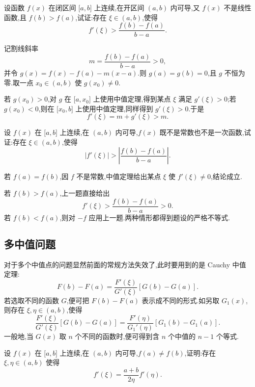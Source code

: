 \begin{example}
    设函数 $f(x)$ 在闭区间 $\lbrack a,b\rbrack$ 上连续,在开区间 $(a,b)$ 内可导,又 $f(x)$ 不是线性函数,且 $f(b)>f(a)$,试证:存在 $\xi\in(a,b)$,使得
    \[
        f'(\xi)>\dfrac{f(b)-f(a)}{b-a}.
    \]
\end{example}
\exampleblank

\begin{solution}
    记割线斜率
    \[
        m=\dfrac{f(b)-f(a)}{b-a}>0,
    \]
    并令 $g(x)=f(x)-f(a)-m(x-a)$.则 $g(a)=g(b)=0$,且 $g$ 不恒为零.取一点 $x_0\in(a,b)$ 使 $g(x_0)\neq0$.

    若 $g(x_0)>0$,对 $g$ 在 $\lbrack a,x_0\rbrack$ 上使用中值定理,得到某点 $\xi$ 满足 $g'(\xi)>0$;若 $g(x_0)<0$,则在 $\lbrack x_0,b\rbrack$ 上使用中值定理,同样得到 $g'(\xi)>0$.于是
    \[
        f'(\xi)=m+g'(\xi)>m.
    \]
\end{solution}

\begin{example}
    设 $f(x)$ 在 $\lbrack a,b\rbrack$ 上连续,在 $(a,b)$ 内可导,$f(x)$ 既不是常数也不是一次函数,试证:存在 $\xi\in(a,b)$,使得
    \[
        |f'(\xi)|>\left|\dfrac{f(b)-f(a)}{b-a}\right|.
    \]
\end{example}
\exampleblank

\begin{solution}
    若 $f(a)=f(b)$,因 $f$ 不是常数,中值定理给出某点 $\xi$ 使 $f'(\xi)\neq0$,结论成立.

    若 $f(b)>f(a)$,上一题直接给出
    \[
        f'(\xi)>\dfrac{f(b)-f(a)}{b-a}>0.
    \]
    若 $f(b)<f(a)$,则对 $-f$ 应用上一题.两种情形都得到题设的严格不等式.
\end{solution}



\subsection{多中值问题}

对于多个中值点的问题显然前面的常规方法失效了,此时要用到的是 Cauchy 中值定理:
\[
    F(b)-F(a)=\dfrac{F'(\xi)}{G'(\xi)}[G(b)-G(a)].
\]
若选取不同的函数 $G$,便可把 $F(b)-F(a)$ 表示成不同的形式.如另取 $G_1(x)$,则存在 $\xi,\eta\in(a,b)$,使得
\[
    \dfrac{F'(\xi)}{G'(\xi)}[G(b)-G(a)]
    =\dfrac{F'(\eta)}{G_1'(\eta)}[G_1(b)-G_1(a)].
\]
一般地,当 $G(x)$ 取 $n$ 个不同的函数时,便可得到含 $n$ 个中值的 $n-1$ 个等式.

\begin{example}
    设 $f(x)$ 在 $\lbrack a,b\rbrack$ 上连续,在 $(a,b)$ 内可导,$f(a)\neq f(b)$,证明:存在 $\xi,\eta\in(a,b)$ 使得
    \[
        f'(\xi)=\dfrac{a+b}{2\eta}f'(\eta).
    \]
\end{example}
\exampleblank

